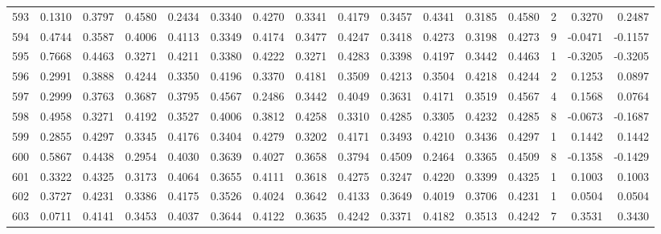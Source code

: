\begin{tabular}{lrrrrrrrrrrrrrrr}
593 &      0.1310 &  0.3797 &  0.4580 &  0.2434 &  0.3340 &  0.4270 &  0.3341 &  0.4179 &  0.3457 &  0.4341 &   0.3185 &     0.4580 &      2 &                    0.3270 &                     0.2487 \\
594 &      0.4744 &  0.3587 &  0.4006 &  0.4113 &  0.3349 &  0.4174 &  0.3477 &  0.4247 &  0.3418 &  0.4273 &   0.3198 &     0.4273 &      9 &                   -0.0471 &                    -0.1157 \\
595 &      0.7668 &  0.4463 &  0.3271 &  0.4211 &  0.3380 &  0.4222 &  0.3271 &  0.4283 &  0.3398 &  0.4197 &   0.3442 &     0.4463 &      1 &                   -0.3205 &                    -0.3205 \\
596 &      0.2991 &  0.3888 &  0.4244 &  0.3350 &  0.4196 &  0.3370 &  0.4181 &  0.3509 &  0.4213 &  0.3504 &   0.4218 &     0.4244 &      2 &                    0.1253 &                     0.0897 \\
597 &      0.2999 &  0.3763 &  0.3687 &  0.3795 &  0.4567 &  0.2486 &  0.3442 &  0.4049 &  0.3631 &  0.4171 &   0.3519 &     0.4567 &      4 &                    0.1568 &                     0.0764 \\
598 &      0.4958 &  0.3271 &  0.4192 &  0.3527 &  0.4006 &  0.3812 &  0.4258 &  0.3310 &  0.4285 &  0.3305 &   0.4232 &     0.4285 &      8 &                   -0.0673 &                    -0.1687 \\
599 &      0.2855 &  0.4297 &  0.3345 &  0.4176 &  0.3404 &  0.4279 &  0.3202 &  0.4171 &  0.3493 &  0.4210 &   0.3436 &     0.4297 &      1 &                    0.1442 &                     0.1442 \\
600 &      0.5867 &  0.4438 &  0.2954 &  0.4030 &  0.3639 &  0.4027 &  0.3658 &  0.3794 &  0.4509 &  0.2464 &   0.3365 &     0.4509 &      8 &                   -0.1358 &                    -0.1429 \\
601 &      0.3322 &  0.4325 &  0.3173 &  0.4064 &  0.3655 &  0.4111 &  0.3618 &  0.4275 &  0.3247 &  0.4220 &   0.3399 &     0.4325 &      1 &                    0.1003 &                     0.1003 \\
602 &      0.3727 &  0.4231 &  0.3386 &  0.4175 &  0.3526 &  0.4024 &  0.3642 &  0.4133 &  0.3649 &  0.4019 &   0.3706 &     0.4231 &      1 &                    0.0504 &                     0.0504 \\
603 &      0.0711 &  0.4141 &  0.3453 &  0.4037 &  0.3644 &  0.4122 &  0.3635 &  0.4242 &  0.3371 &  0.4182 &   0.3513 &     0.4242 &      7 &                    0.3531 &                     0.3430 \\

\end{tabular}
